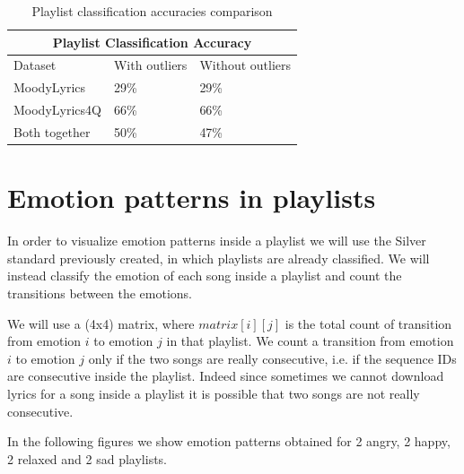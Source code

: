 \begin{table}[H]
\centering
\begin{tabular}{ |p{3cm}||p{1.5cm}|p{1.5cm}| }
 \hline
 \multicolumn{3}{|c|}{Playlist Classification Accuracy} \\
 \hline
Dataset & With outliers & Without outliers\\
 \hline
MoodyLyrics & 29\% & 29\%\\
MoodyLyrics4Q  & 66\%    &66\%\\
Both together &   50\%  & 47\%\\
\hline
\end{tabular}
\caption{Playlist classification accuracies comparison} \label{tab:comparison2}
\end{table}

\section{Emotion patterns in playlists}
In order to visualize emotion patterns inside a playlist we will use the Silver standard previously created, in which playlists are already classified. We will instead classify the emotion of each song inside a playlist and count the transitions between the emotions.\par
We will use a (4x4) matrix, where $matrix[i][j]$ is the total count of transition from emotion $i$ to emotion $j$ in that playlist. We count a transition from emotion $i$ to emotion $j$ only if the two songs are really consecutive, i.e. if the sequence IDs are consecutive inside the playlist. Indeed since sometimes we cannot download lyrics for a song inside a playlist it is possible that two songs are not really consecutive. \par

In the following figures we show emotion patterns obtained for 2 angry, 2 happy, 2 relaxed and 2 sad playlists. 

